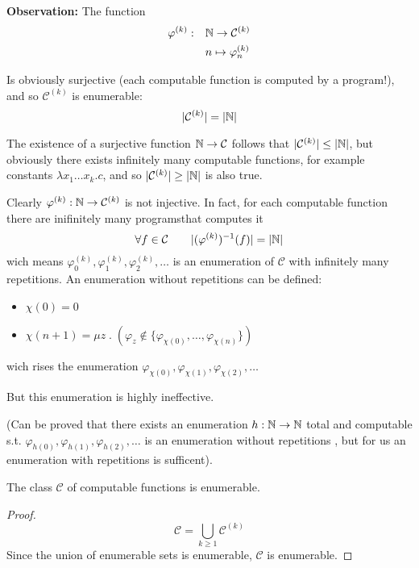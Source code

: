 \textbf{Observation:} The function \[
  \begin{split}
    \varphi^{(k)} : & \quad \mathbb{N} \rightarrow \mathcal{C}^{(k)} \\
    & \quad n \mapsto \varphi_n^{(k)}
  \end{split}
\]

Is obviously surjective (each computable function is computed by a
program!), and so $\mathcal{C}^{(k)}$ is enumerable:
\[|\mathcal{C}^{(k)}| = |\mathbb{N}|\]

The existence of a surjective function $\mathbb{N} \rightarrow \mathcal{C}$
follows that $|\mathcal{C}^{(k)}| \leq |\mathbb{N}|$, but obviously there
exists infinitely many computable functions, for example constants
$\lambda x_1 \dots x_k . c$, and so $|\mathcal{C}^{(k)}| \geq |\mathbb{N}|$
is also true.

Clearly $\varphi^{(k)} : \mathbb{N} \rightarrow \mathcal{C}^{(k)}$ is not
injective. In fact, for each computable function there are inifinitely
many programsthat computes it
\[\forall f \in \mathcal{C} \quad \quad |(\varphi^{(k)})^{-1}(f)| =
  |\mathbb{N}|\] wich means
\(\varphi_0^{(k)}, \varphi_1^{(k)}, \varphi_2^{(k)}, \dots\) is an
enumeration of $\mathcal{C}$ with infinitely many repetitions. An
enumeration without repetitions can be defined:
\begin{itemize}
\item[] $\chi(0) = 0$
\item[]
  $\chi(n+1) = \mu z \; . \; (\varphi_z \notin \{\varphi_{\chi(0)},
  \dots, \varphi_{\chi(n)}\})$
\end{itemize}
wich rises the enumeration
$\varphi_{\chi(0)}, \varphi_{\chi(1)}, \varphi_{\chi(2)}, \dots$

But this enumeration is highly ineffective.

(Can be proved that there exists an enumeration
$h : \mathbb{N} \rightarrow \mathbb{N}$ total and computable s.t.
$\varphi_{h(0)}, \varphi_{h(1)}, \varphi_{h(2)}, \dots$ is an
enumeration without repetitions \cite{firedberg:1958}, but for us an
enumeration with repetitions is sufficent).

\begin{theorem}[$|\mathcal{C}| = |\nat|$]
  The class $\mathcal{C}$ of computable functions is enumerable.
  \begin{proof}
    \[ \mathcal{C} = \bigcup_{k \geq 1}\mathcal{C}^{(k)} \] Since the
    union of enumerable sets is enumerable, $\mathcal{C}$ is
    enumerable.
  \end{proof}
\end{theorem}

